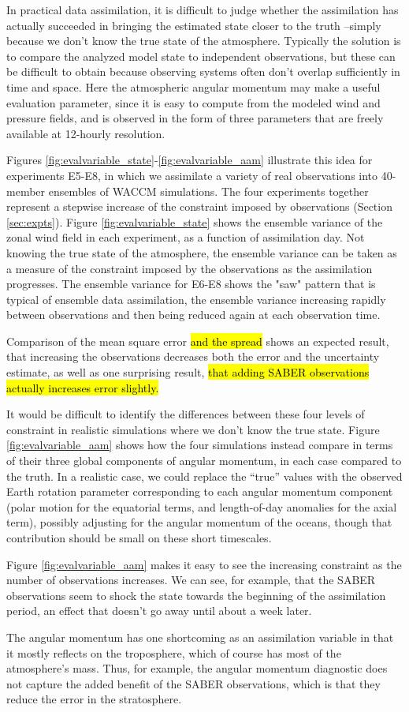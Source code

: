 In practical data assimilation, it is difficult to judge whether the assimilation has actually succeeded in bringing the estimated state closer to the truth --simply because we don't know the true state of the atmosphere.
Typically the solution is to compare the analyzed model state to independent observations, but these can be difficult to obtain because observing systems often don't overlap sufficiently in time and space.
Here the atmospheric angular momentum may make a useful evaluation parameter, since it is easy to compute from the modeled wind and pressure fields, and is observed in the form of three parameters that are freely available at 12-hourly resolution.  

Figures \ref{fig:evalvariable_state}-\ref{fig:evalvariable_aam} illustrate this idea for experiments E5-E8, in which we assimilate a variety of real observations into 40-member ensembles of WACCM simulations.  
The four experiments together represent a stepwise increase of the constraint imposed by observations (Section \ref{sec:expts}).  
Figure \ref{fig:evalvariable_state} shows the ensemble variance of the zonal wind field in each experiment, as a function of assimilation day. 
Not knowing the true state of the atmosphere, the ensemble variance can be taken as a measure of the constraint imposed by the observations as the assimilation progresses. 
The ensemble variance for E6-E8 shows the "saw" pattern that is typical of ensemble data assimilation, the ensemble variance increasing rapidly between observations and then being reduced again at each observation time. 

Comparison of the mean square error \hl{and the spread} shows an expected result, that increasing the observations decreases both the error and the uncertainty estimate, as well as one surprising result, \hl{that adding SABER observations actually increases error slightly.} 

It would be difficult to identify the differences between these four levels of constraint in realistic simulations where we don't know the true state. 
Figure \ref{fig:evalvariable_aam} shows how the four simulations instead compare in terms of their three global components of angular momentum, in each case compared to the truth.  
In a realistic case, we could replace the ``true'' values with the observed Earth rotation parameter corresponding to each angular momentum component (polar motion for the equatorial terms, and length-of-day anomalies for the axial term), possibly adjusting for the angular momentum of the oceans, though that contribution should be small on these short timescales.  

Figure  \ref{fig:evalvariable_aam} makes it easy to see the increasing constraint as the number of observations increases.
We can see, for example, that the SABER observations seem to shock the state towards the beginning of the assimilation period, an effect that doesn't go away until about a week later.  

The angular momentum has one shortcoming as an assimilation variable in that it mostly reflects on the troposphere, which of course has most of the atmosphere's mass.
Thus, for example, the angular momentum diagnostic does not capture the added benefit of the SABER observations, which is that they reduce the error in the stratosphere. 
